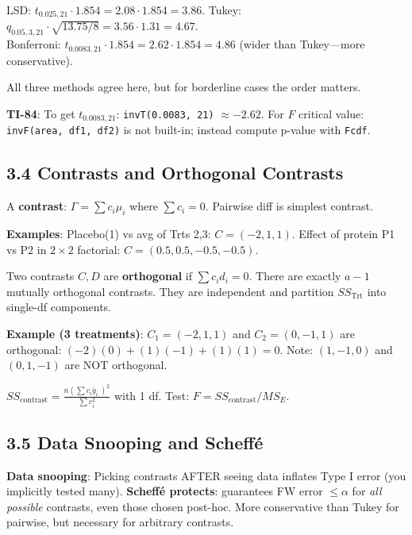 \documentclass[9pt,letterpaper]{article}
\begin{document}
LSD: $t_{0.025,21}\cdot 1.854 = 2.08\cdot 1.854 = 3.86$. \quad Tukey: $q_{0.05,3,21}\cdot\sqrt{13.75/8} = 3.56\cdot 1.31 = 4.67$.\\
Bonferroni: $t_{0.0083,21}\cdot 1.854 = 2.62\cdot 1.854 = 4.86$ (wider than Tukey---more conservative).

All three methods agree here, but for borderline cases the order matters.

\begin{calcbox}
\textbf{TI-84}: To get $t_{0.0083,21}$: \texttt{invT(0.0083, 21)} $\approx -2.62$. For $F$ critical value: \texttt{invF(area, df1, df2)} is not built-in; instead compute p-value with \texttt{Fcdf}.
\end{calcbox}

\subsection{3.4 Contrasts and Orthogonal Contrasts}

A \textbf{contrast}: $\Gamma = \sum c_i \mu_i$ where $\sum c_i = 0$. Pairwise diff is simplest contrast.

\textbf{Examples}: Placebo(1) vs avg of Trts 2,3: $C=(-2,1,1)$. Effect of protein P1 vs P2 in $2\times 2$ factorial: $C=(0.5, 0.5, -0.5, -0.5)$.

Two contrasts $C,D$ are \textbf{orthogonal} if $\sum c_i d_i = 0$. There are exactly $a-1$ mutually orthogonal contrasts. They are independent and partition $SS_{\text{Trt}}$ into single-df components.

\textbf{Example (3 treatments)}: $C_1=(-2,1,1)$ and $C_2=(0,-1,1)$ are orthogonal: $(-2)(0)+(1)(-1)+(1)(1)=0$. Note: $(1,-1,0)$ and $(0,1,-1)$ are NOT orthogonal.

$SS_{\text{contrast}} = \frac{n(\sum c_i \bar{y}_{i.})^2}{\sum c_i^2}$ with 1 df. Test: $F = SS_{\text{contrast}}/MS_E$.

\subsection{3.5 Data Snooping and Scheff\'e}

\textbf{Data snooping}: Picking contrasts AFTER seeing data inflates Type I error (you implicitly tested many). \textbf{Scheff\'e protects}: guarantees FW error $\le \alpha$ for \emph{all possible} contrasts, even those chosen post-hoc. More conservative than Tukey for pairwise, but necessary for arbitrary contrasts.

\end{document}
